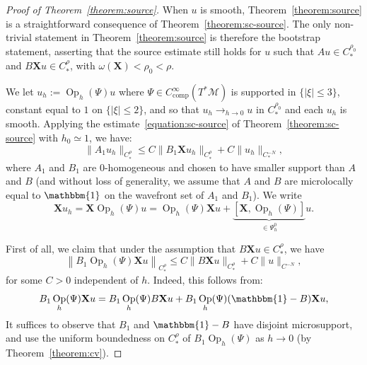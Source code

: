 \documentclass[10pt]{amsart}
\theoremstyle{definition}\newtheorem{defi}[theo]{Definition}\newtheorem{rema}[theo]{Remark}\newtheorem{exam}[theo]{Example}\newtheorem{exem}[theo]{Example}\newtheorem{nota}[theo]{Notation}
\newcommand{\X}{\mathbf{X}}
\newcommand{\M}{\mathcal{M}}
\newcommand{\comp}{\mathrm{comp}}
\DeclareMathOperator{\Op}{Op}
\begin{document}
\begin{proof}[Proof of Theorem~\ref{theorem:source}]
When $u$ is smooth, Theorem~\ref{theorem:source} is a straightforward consequence of Theorem~\ref{theorem:sc-source}. The only non-trivial statement in Theorem~\ref{theorem:source} is therefore the bootstrap statement, asserting that the source estimate still holds for $u$ such that $Au \in C^{\rho_0}_*$ and $B \X u \in C^\rho_*$, with $\omega(\X) < \rho_0 < \rho$.


We let $u_{h} := \Op_{h}(\Psi)u$ where $\Psi \in C^\infty_{\comp}(T^*\M)$ is supported in $\{|\xi| \leq 3\}$, constant equal to $1$ on $\{|\xi| \leq 2\}$, and so that $u_{h} \to_{h \to 0} u$ in $C^{\rho_0}_*$ and each $u_{h}$ is smooth. Applying the estimate~\eqref{equation:sc-source} of Theorem~\ref{theorem:sc-source} with $h_0 \simeq 1$, we have:
\[
\| A_1 u_{h}\|_{C^\rho_\ast} \leq C \| B_1 \X u_{h} \|_{C^{\rho}_\ast} + C \|u_{h}\|_{C^{-N}_*},
\]
where $A_1$ and $B_1$ are $0$-homogeneous and chosen to have smaller support than $A$ and $B$ (and without loss of generality, we assume that $A$ and $B$ are microlocally equal to $\mathbbm{1}$ on the wavefront set of $A_1$ and $B_1$). We write
\[
\X u_{h} = \X \Op_{h}(\Psi) u = \Op_{h}(\Psi) \X u + \underset{\in \Psi_{h}^0}{\underbrace{\left[\X, \Op_{h}(\Psi)\right]}} u.
\]

First of all, we claim that under the assumption that $B \X u \in C^\rho_*$, we have
\[
\left\|B_1 \Op_{h}(\Psi) \X u\right\|_{C^\rho_*} \leq C \| B \X u\|_{C^\rho_*} + C \| u \|_{C^{-N}},
\]
for some $C > 0$ independent of $h$. Indeed, this follows from:
\[
B_1 \Op_{h}(\Psi) \X u = B_1 \Op_{h}(\Psi) B \X u + B_1 \Op_{h}(\Psi) (\mathbbm{1}-B) \X u,
\]
It suffices to observe that $B_1$ and $\mathbbm{1}-B$ have disjoint microsupport, and use the uniform boundedness on $C^\rho_\ast $ of $B_1 \Op_h(\Psi)$ as $h\to 0$ (by Theorem~\ref{theorem:cv}).


\end{proof}
\end{document}
